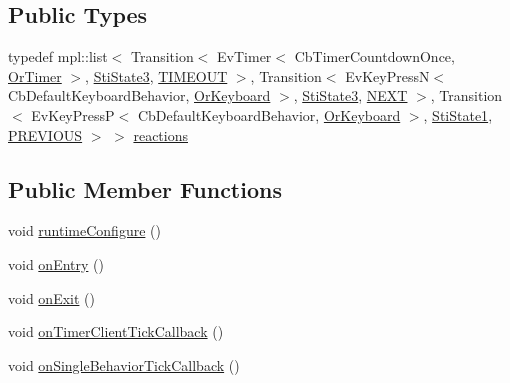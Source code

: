 \subsection*{Public Types}
\begin{DoxyCompactItemize}
\item 
typedef mpl\+::list$<$ Transition$<$ Ev\+Timer$<$ Cb\+Timer\+Countdown\+Once, \hyperlink{classsm__three__some_1_1OrTimer}{Or\+Timer} $>$, \hyperlink{structsm__three__some_1_1inner__states_1_1StiState3}{Sti\+State3}, \hyperlink{structsm__three__some_1_1inner__states_1_1StiState2_1_1TIMEOUT}{T\+I\+M\+E\+O\+UT} $>$, Transition$<$ Ev\+Key\+PressN$<$ Cb\+Default\+Keyboard\+Behavior, \hyperlink{classsm__three__some_1_1OrKeyboard}{Or\+Keyboard} $>$, \hyperlink{structsm__three__some_1_1inner__states_1_1StiState3}{Sti\+State3}, \hyperlink{structsm__three__some_1_1inner__states_1_1StiState2_1_1NEXT}{N\+E\+XT} $>$, Transition$<$ Ev\+Key\+PressP$<$ Cb\+Default\+Keyboard\+Behavior, \hyperlink{classsm__three__some_1_1OrKeyboard}{Or\+Keyboard} $>$, \hyperlink{structsm__three__some_1_1inner__states_1_1StiState1}{Sti\+State1}, \hyperlink{structsm__three__some_1_1inner__states_1_1StiState2_1_1PREVIOUS}{P\+R\+E\+V\+I\+O\+US} $>$ $>$ \hyperlink{structsm__three__some_1_1inner__states_1_1StiState2_a35556a3ab61ab56f2aa5d896b8330082}{reactions}
\end{DoxyCompactItemize}
\subsection*{Public Member Functions}
\begin{DoxyCompactItemize}
\item 
void \hyperlink{structsm__three__some_1_1inner__states_1_1StiState2_a46bf7c838fb2cbf92e5b17b17165af41}{runtime\+Configure} ()
\item 
void \hyperlink{structsm__three__some_1_1inner__states_1_1StiState2_a71c494eeec8ee133d157f40f64c455cf}{on\+Entry} ()
\item 
void \hyperlink{structsm__three__some_1_1inner__states_1_1StiState2_a853417ccfaacf0c0d9040ab0774e6588}{on\+Exit} ()
\item 
void \hyperlink{structsm__three__some_1_1inner__states_1_1StiState2_a59008027e276123e39a8908116ea8ab9}{on\+Timer\+Client\+Tick\+Callback} ()
\item 
void \hyperlink{structsm__three__some_1_1inner__states_1_1StiState2_ad29b2ce248085bc08950b43726a84d18}{on\+Single\+Behavior\+Tick\+Callback} ()
\end{DoxyCompactItemize}
